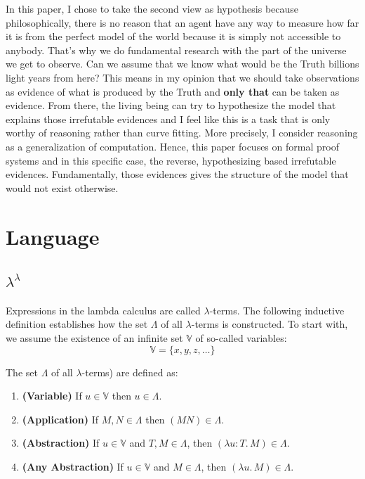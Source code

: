 In this paper, I chose to take the second view as hypothesis because philosophically, there is no reason that an agent have any way to measure how far it is from the perfect model of the world because it is simply not accessible to anybody. That's why we do fundamental research with the part of the universe we get to observe. Can we assume that we know what would be the Truth billions light years from here? This means in my opinion that we should take observations as evidence of what is produced by the Truth and \textbf{only that} can be taken as evidence. From there, the living being can try to hypothesize the model that explains those irrefutable evidences and I feel like this is a task that is only worthy of reasoning rather than curve fitting. More precisely, I consider reasoning as a generalization of computation. Hence, this paper focuses on formal proof systems and in this specific case, the reverse, hypothesizing based irrefutable evidences. Fundamentally, those evidences gives the structure of the model that would not exist otherwise.

\section{Language}

\subsection{$\lambda^\lambda$}

Expressions in the lambda calculus are called \(\lambda\)-terms. The following inductive definition establishes how the set \(\Lambda\) of all \(\lambda\)-terms is constructed. To start with, we assume the existence of an infinite set \(\mathbb{V}\) of so-called variables:
\[
\mathbb{V} = \{ x, y, z, \dots \}
\]
\begin{definition}
The set \(\Lambda\) of all \(\lambda\)-terms) are defined as:
\begin{enumerate}
    \item \textbf{(Variable)} If \(u \in \mathbb{V}\) then \(u \in \Lambda\).
    \item \textbf{(Application)} If \(M, N \in \Lambda\) then \((MN) \in \Lambda\).
    \item \textbf{(Abstraction)} If \(u \in \mathbb{V}\) and \(T, M \in \Lambda\), then \((\lambda u : T .\, M) \in \Lambda\).
    \item \textbf{(Any Abstraction)} If \(u \in \mathbb{V}\) and \(M \in \Lambda\), then \((\lambda u .\, M) \in \Lambda\).
\end{enumerate}
\end{definition}

